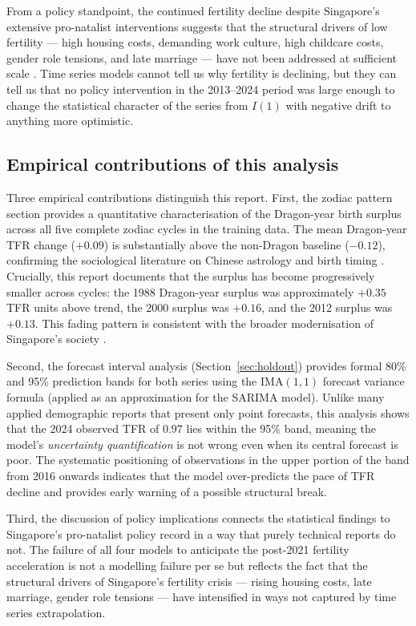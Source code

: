 \documentclass[12pt,a4paper]{article}
\begin{document}
From a policy standpoint, the continued fertility decline despite Singapore's
extensive pro-natalist interventions suggests that the structural drivers of low
fertility --- high housing costs, demanding work culture, high childcare costs,
gender role tensions, and late marriage --- have not been addressed at sufficient scale
\citep{mcdonald2006}. Time series models cannot tell us why fertility is declining,
but they can tell us that no policy intervention in the 2013--2024 period was large
enough to change the statistical character of the series from $I(1)$ with negative
drift to anything more optimistic.

\subsection{Empirical contributions of this analysis}

Three empirical contributions distinguish this report. First, the zodiac pattern
section provides a quantitative characterisation of the Dragon-year birth surplus
across all five complete zodiac cycles in the training data. The mean Dragon-year TFR
change ($+0.09$) is substantially above the non-Dragon baseline ($-0.12$), confirming
the sociological literature on Chinese astrology and birth timing \citep{goodkind1991}.
Crucially, this report documents that the surplus has become progressively smaller
across cycles: the 1988 Dragon-year surplus was approximately $+0.35$ TFR units above
trend, the 2000 surplus was $+0.16$, and the 2012 surplus was $+0.13$. This fading
pattern is consistent with the broader modernisation of Singapore's society
\citep{jones1990}.

Second, the forecast interval analysis (Section~\ref{sec:holdout}) provides formal 80\%
and 95\% prediction bands for both series using the IMA$(1,1)$ forecast variance
formula (applied as an approximation for the SARIMA model).
Unlike many applied demographic reports that present only point forecasts, this analysis
shows that the 2024 observed TFR of $0.97$ lies within the 95\% band, meaning the model's
\textit{uncertainty quantification} is not wrong even when its central forecast is poor.
The systematic positioning of observations in the upper portion of the band from 2016
onwards indicates that the model over-predicts the pace of TFR decline and provides
early warning of a possible structural break.

Third, the discussion of policy implications connects the statistical findings to
Singapore's pro-natalist policy record in a way that purely technical reports do not.
The failure of all four models to anticipate the post-2021 fertility acceleration
is not a modelling failure per se but reflects the fact that the structural drivers
of Singapore's fertility crisis --- rising housing costs, late marriage, gender role
tensions --- have intensified in ways not captured by time series extrapolation.
\end{document}
